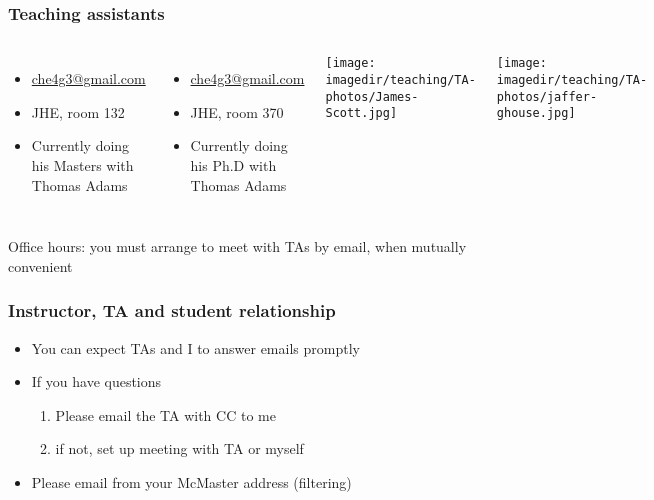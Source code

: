 \begin{frame}\frametitle{Teaching assistants}
	\begin{columns}[c]
			{\color{myGreen}{James Scott}}
			\begin{itemize}
				\item	\url{che4g3@gmail.com}
				\item	JHE, room 132
				\item	Currently doing his Masters with Thomas Adams
			\end{itemize}
			
			\vspace{0.8cm}
			{\color{myGreen}{Jaffer Ghouse}}
			\begin{itemize}
				\item	\url{che4g3@gmail.com}
				\item	JHE, room 370
				\item	Currently doing his Ph.D with Thomas Adams
			\end{itemize}
			
			\centerline{\texttt{[image: \\imagedir/teaching/TA-photos/James-Scott.jpg]}}
			
			\vspace{0.5cm}
			\centerline{\texttt{[image: \\imagedir/teaching/TA-photos/jaffer-ghouse.jpg]}}

	\end{columns}
	
	\vspace{0.3cm}
	{\color{myOrange}\scriptsize{Office hours: you must arrange to meet with TAs by email, when mutually convenient}}
\end{frame}

\begin{frame}\frametitle{Instructor, TA and student relationship}
	\begin{itemize}
		\item	You can expect TAs and I to answer emails promptly

		\vspace{12pt}
		\item	If you have questions
			\begin{enumerate}
				\item	Please email the TA with CC to me \hfill {\tiny{\color{myOrange}{$\longleftarrow$ hopefully this solves your problem}}}
				\item	if not, set up meeting with TA or myself
			\end{enumerate}
		\item	Please email from your McMaster address (filtering)
	\end{itemize}
\end{frame}

